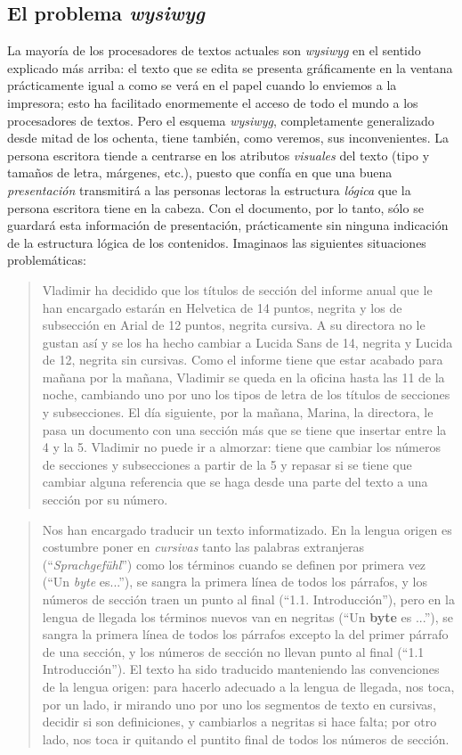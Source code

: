 \subsection{El problema \emph{wysiwyg}}\label{s3:problema_wysiwyg} La mayoría de los procesadores de textos actuales son \emph{wysiwyg} en el sentido explicado más arriba: el texto que se edita se presenta gráficamente en la ventana prácticamente igual a como se verá en el papel cuando lo enviemos a la impresora; esto ha facilitado enormemente el acceso de todo el mundo a los procesadores de textos. Pero el esquema \emph{wysiwyg}, completamente generalizado desde mitad de los ochenta, tiene también, como veremos, sus inconvenientes. La persona escritora tiende a centrarse en los atributos \emph{visuales} del texto (tipo y tamaños de letra, márgenes, etc.), puesto que confía en que una buena \emph{presentación} transmitirá a las personas lectoras la estructura \emph{lógica} que la persona escritora tiene en la cabeza. Con el documento, por lo tanto, sólo se guardará esta información de presentación, prácticamente sin ninguna indicación de la estructura lógica de los contenidos. Imaginaos las siguientes situaciones problemáticas: \begin{quote} Vladimir ha decidido que los títulos de sección del informe anual que le han encargado estarán en Helvetica de 14 puntos, negrita y los de subsección en Arial de 12 puntos, negrita cursiva. A su directora no le gustan así y se los ha hecho cambiar a Lucida Sans de 14, negrita y Lucida de 12, negrita sin cursivas. Como el informe tiene que estar acabado para mañana por la mañana, Vladimir se queda en la oficina hasta las 11 de la noche, cambiando uno por uno los tipos de letra de los títulos de secciones y subsecciones. El día siguiente, por la mañana, Marina, la directora, le pasa un documento con una sección más que se tiene que insertar entre la 4 y la 5. Vladimir no puede ir a almorzar: tiene que cambiar los números de secciones y subsecciones a partir de la 5 y repasar si se tiene que cambiar alguna referencia que se haga desde una parte del texto a una sección por su número. \end{quote} 

\begin{quote} Nos han encargado traducir un texto informatizado. En la lengua origen es costumbre poner en \emph{cursivas} tanto las palabras extranjeras (``\emph{Sprachgefühl}'') como los términos cuando se definen por primera vez (``Un \emph{byte} es...''), se sangra la primera línea de todos los párrafos, y los números de sección traen un punto al final (``1.1. Introducción''), pero en la lengua de llegada los términos nuevos van en negritas (``Un \textbf{byte} es ...''), se sangra la primera línea de todos los párrafos excepto la del primer párrafo de una sección, y los números de sección no llevan punto al final (``1.1 Introducción''). El texto ha sido traducido manteniendo las convenciones de la lengua origen: para hacerlo adecuado a la lengua de llegada, nos toca, por un lado, ir mirando uno por uno los segmentos de texto en cursivas, decidir si son definiciones, y cambiarlos a negritas si hace falta; por otro lado, nos toca ir quitando el puntito final de todos los números de sección. \end{quote} 

